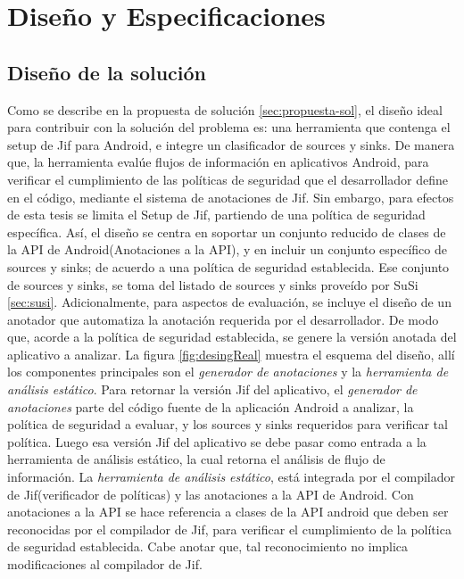 \label{ch:desing}
\chapter{Diseño y Especificaciones}


\section{Diseño de la solución}
\label{sec:sol-desig}
Como se describe en la propuesta de solución \ref{sec:propuesta-sol}, el
diseño ideal para contribuir con la solución del problema es: una herramienta
que contenga el setup de Jif para Android, e integre un clasificador de
sources y sinks. De manera que, la herramienta evalúe flujos de información en
aplicativos Android, para verificar el cumplimiento de las políticas de
seguridad que el desarrollador define en el código, mediante el sistema de
anotaciones de Jif.\newline
Sin embargo, para efectos de esta tesis se limita el Setup de Jif, partiendo de
una política de seguridad específica. Así, el diseño se centra en soportar un
conjunto reducido de clases de la API de Android(Anotaciones a la API), y en
incluir un conjunto específico de sources y sinks; de acuerdo a una política de
seguridad establecida. Ese conjunto de sources y sinks, se toma del listado de
sources y sinks proveído por SuSi \ref{sec:susi}.\newline 
Adicionalmente, para aspectos de evaluación, se incluye el diseño de un
anotador que automatiza la anotación requerida por el desarrollador.
De modo que, acorde a la política de seguridad establecida, se genere la
versión anotada del aplicativo a analizar.\newline
La figura \ref{fig:desingReal} muestra el esquema del diseño, allí los componentes
principales son el \emph{generador de anotaciones} y la \emph{herramienta de
análisis estático}.\newline 
Para retornar la versión Jif del aplicativo, el \emph{generador de anotaciones}
parte del código fuente de la aplicación Android a analizar, la política de
seguridad a evaluar, y los sources y sinks requeridos para verificar tal
política.\newline 
Luego esa versión Jif del aplicativo se debe pasar como entrada a la herramienta
de análisis estático, la cual retorna el análisis de flujo de
información.\newline 
La \emph{herramienta de análisis estático}, está integrada
por el compilador de Jif(verificador de políticas) y las anotaciones a la API de Android. Con
anotaciones a la API se hace referencia a clases de la API android que deben ser
reconocidas por el compilador de Jif, para verificar el cumplimiento de la
política de seguridad establecida. Cabe anotar que, tal reconocimiento no
implica modificaciones al compilador de Jif.

